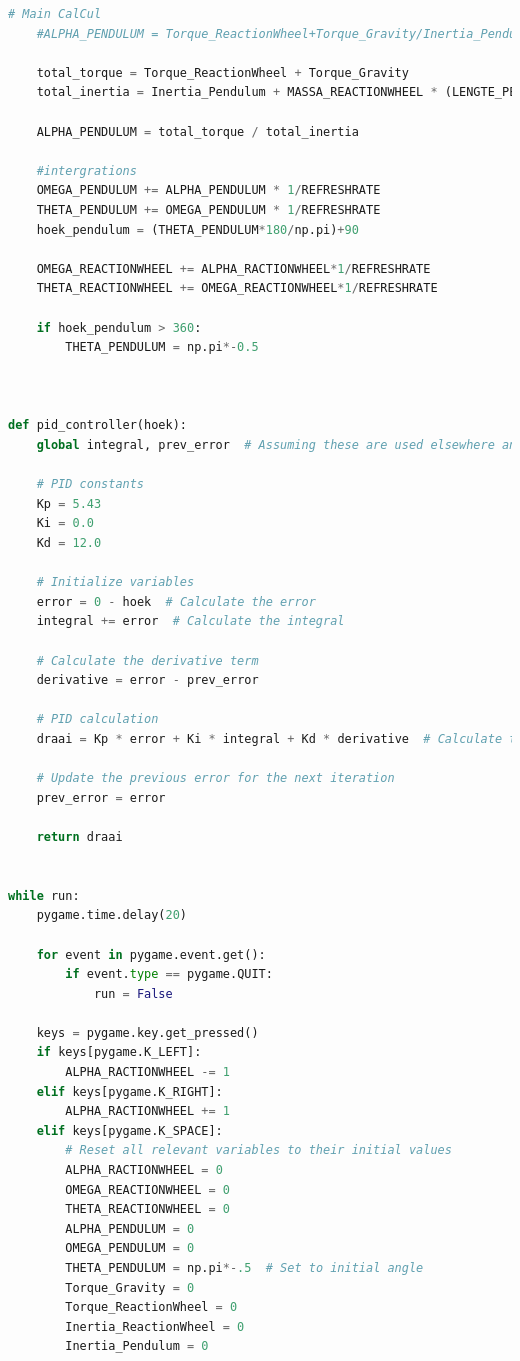\documentclass{article}
\begin{document}
\begin{lstlisting}[language=Python, caption=Python simulation]
    # Main CalCul
    #ALPHA_PENDULUM = Torque_ReactionWheel+Torque_Gravity/Inertia_Pendulum+MASSA_REACTIONWHEEL*(LENGTE_PENDULUM**2)

    total_torque = Torque_ReactionWheel + Torque_Gravity
    total_inertia = Inertia_Pendulum + MASSA_REACTIONWHEEL * (LENGTE_PENDULUM**2)

    ALPHA_PENDULUM = total_torque / total_inertia

    #intergrations
    OMEGA_PENDULUM += ALPHA_PENDULUM * 1/REFRESHRATE
    THETA_PENDULUM += OMEGA_PENDULUM * 1/REFRESHRATE
    hoek_pendulum = (THETA_PENDULUM*180/np.pi)+90

    OMEGA_REACTIONWHEEL += ALPHA_RACTIONWHEEL*1/REFRESHRATE
    THETA_REACTIONWHEEL += OMEGA_REACTIONWHEEL*1/REFRESHRATE

    if hoek_pendulum > 360:
        THETA_PENDULUM = np.pi*-0.5



def pid_controller(hoek):
    global integral, prev_error  # Assuming these are used elsewhere and need to be shared

    # PID constants
    Kp = 5.43
    Ki = 0.0
    Kd = 12.0

    # Initialize variables
    error = 0 - hoek  # Calculate the error
    integral += error  # Calculate the integral

    # Calculate the derivative term
    derivative = error - prev_error

    # PID calculation
    draai = Kp * error + Ki * integral + Kd * derivative  # Calculate the control output

    # Update the previous error for the next iteration
    prev_error = error

    return draai


while run:
    pygame.time.delay(20)

    for event in pygame.event.get():
        if event.type == pygame.QUIT:
            run = False

    keys = pygame.key.get_pressed()
    if keys[pygame.K_LEFT]:
        ALPHA_RACTIONWHEEL -= 1
    elif keys[pygame.K_RIGHT]:
        ALPHA_RACTIONWHEEL += 1
    elif keys[pygame.K_SPACE]:
        # Reset all relevant variables to their initial values
        ALPHA_RACTIONWHEEL = 0
        OMEGA_REACTIONWHEEL = 0
        THETA_REACTIONWHEEL = 0
        ALPHA_PENDULUM = 0
        OMEGA_PENDULUM = 0
        THETA_PENDULUM = np.pi*-.5  # Set to initial angle
        Torque_Gravity = 0
        Torque_ReactionWheel = 0
        Inertia_ReactionWheel = 0
        Inertia_Pendulum = 0


\end{lstlisting}
\end{document}
